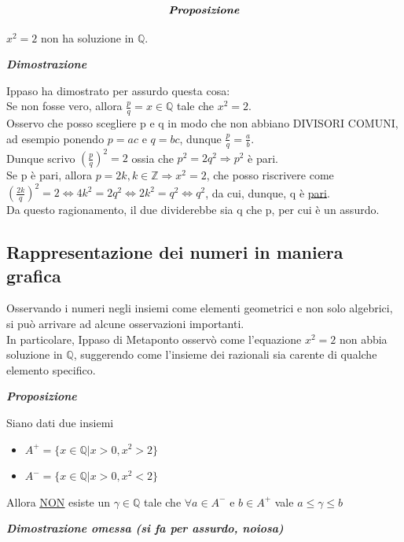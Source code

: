 \documentclass{article}
\theoremstyle{definition}
\begin{document}
\begin{center}
\begin{equation}
\textit{\textbf{Proposizione}}
\end{equation}

\end{center}
$x^2=2$ non ha soluzione in $\mathbb{Q}$.
\begin{center}
    \textbf{\textit{Dimostrazione}}
\end{center}
Ippaso ha dimostrato per assurdo questa cosa:
\\
Se non fosse vero, allora $\frac{p}{q}=x \in \mathbb{Q}$ tale che $x^2=2$.
\\ 
Osservo che posso scegliere p e q in modo che non abbiano DIVISORI COMUNI, ad esempio ponendo $p=ac$ e $q=bc$, dunque $\frac{p}{q}=\frac{a}{b}$.
\\
Dunque scrivo $(\frac{p}{q})^2=2$ ossia che $p^2=2q^2 \Longrightarrow p^2$ è pari.
\\
Se p è pari, allora $p=2k, k\in \mathbb{Z} \Longrightarrow x^2=2$, che posso riscrivere come $(\frac{2k}{q})^2=2 \Longleftrightarrow 4k^2=2q^2 \Longleftrightarrow 2k^2=q^2 \Longleftrightarrow q^2$, da cui, dunque, q è \underline{pari}.
\\
Da questo ragionamento, il due dividerebbe sia q che p, per cui è un assurdo.

\subsection{Rappresentazione dei numeri in maniera grafica}
Osservando i numeri negli insiemi come elementi geometrici e non solo algebrici, si può arrivare ad alcune osservazioni importanti.
\\
In particolare, Ippaso di Metaponto osservò come l'equazione $x^2=2$ non abbia soluzione in $\mathbb{Q}$, suggerendo come l'insieme dei razionali sia carente di qualche elemento specifico.

\begin{center}
  \textbf{\textit{ Proposizione }}
\end{center}
Siano dati due insiemi
\begin{itemize}
    \item $A^+=\{x \in \mathbb{Q} | x>0, x^2>2\}$
    \item $A^-=\{x \in \mathbb{Q}| x>0, x^2<2\}$

\end{itemize}
Allora \underline{\underline{NON}} esiste un $\gamma \in \mathbb{Q}$ tale che $\forall a \in A^-$ e $b \in A^+$ vale $a \leqslant \gamma \leqslant b$
\begin{center}
    \textbf{\textit{Dimostrazione omessa (si fa per assurdo, noiosa)}}
\end{center}
\end{document}
